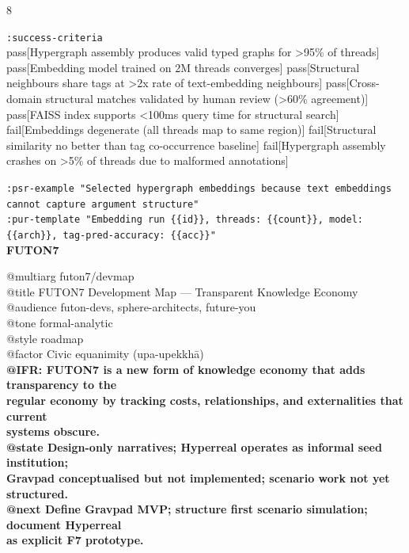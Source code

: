 \documentclass[landscape]{article}
\begin{document}
\begin{paracol}{8}
\par
  \texttt{:\allowbreak{}success-\allowbreak{}criteria}\\
    pass[Hypergraph assembly produces valid typed graphs for >95\% of threads] pass[Embedding model trained on 2M threads converges] pass[Structural neighbours share tags at >2x rate of text-embedding neighbours] pass[Cross-domain structural matches validated by human review (>60\% agreement)] pass[FAISS index supports <100ms query time for structural search] fail[Embeddings degenerate (all threads map to same region)] fail[Structural similarity no better than tag co-occurrence baseline] fail[Hypergraph assembly crashes on >5\% of threads due to malformed annotations]\\
\par
  \texttt{:\allowbreak{}psr-\allowbreak{}example "Selected hypergraph embeddings because text embeddings cannot capture argument structure"}\\
  \texttt{:\allowbreak{}pur-\allowbreak{}template "Embedding run \{\{id\}\},\allowbreak{} threads:\allowbreak{} \{\{count\}\},\allowbreak{} model:\allowbreak{} \{\{arch\}\},\allowbreak{} tag-\allowbreak{}pred-\allowbreak{}accuracy:\allowbreak{} \{\{acc\}\}"}\\
\switchcolumn
\textbf{FUTON7}\par
\medskip
@multiarg futon7/devmap\\
@title FUTON7 Development Map — Transparent Knowledge Economy\\
@audience futon-devs, sphere-architects, future-you\\
@tone formal-analytic\\
@style roadmap\\
@factor Civic equanimity (upa-upekkhā)\\
\textbf{@IFR: FUTON7 is a new form of knowledge economy that adds transparency to the}\\
\textbf{regular economy by tracking costs, relationships, and externalities that current}\\
\textbf{systems obscure.}\\
\textbf{@state Design-only narratives; Hyperreal operates as informal seed institution;}\\
\textbf{Gravpad conceptualised but not implemented; scenario work not yet structured.}\\
\textbf{@next Define Gravpad MVP; structure first scenario simulation; document Hyperreal}\\
\textbf{as explicit F7 prototype.}\\

\end{paracol}
\end{document}
